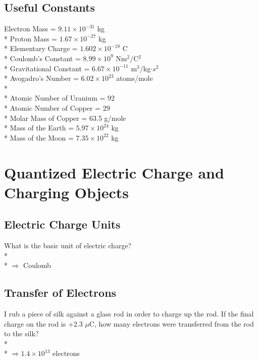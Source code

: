 \documentclass[11pt]{article}
\begin{document}
\maketitle
\tableofcontents
\vspace{50pt}

\subsection*{Useful Constants}
Electron Mass = $9.11 \times 10^{-31}$ kg \\*
Proton Mass = $1.67 \times 10^{-27}$ kg \\*
Elementary Charge = $1.602 \times 10^{-19}$ C \\*
Coulomb's Constant = $8.99 \times 10^9$ Nm$^2$/C$^2$ \\*
Gravitational Constant = $6.67 \times 10^{-11}$ m$^3$/kg$\cdot s^2$ \\*
Avogadro's Number = $ 6.02 \times 10^{23}$ atoms/mole \\*\\*
Atomic Number of Uranium = 92 \\*
Atomic Number of Copper = 29 \\*
Molar Mass of Copper = 63.5 g/mole \\*
Mass of the Earth = $5.97 \times 10^{24}$ kg\\*
Mass of the Moon = $7.35 \times 10^{22}$ kg


\pagebreak
\section{Quantized Electric Charge and Charging Objects}
\vspace{10pt}

\subsection{Electric Charge Units}
What is the basic unit of electric charge?\\* \\*
$\Rightarrow$ Coulomb

\subsection{Transfer of Electrons}
I rub a piece of silk against a glass rod in order to charge up the rod.  If the final charge on the rod is +2.3 $\mu$C, how many electrons were transferred from the rod to the silk? \\* \\*
$\Rightarrow 1.4 \times 10^{13}$ electrons
\end{document}
